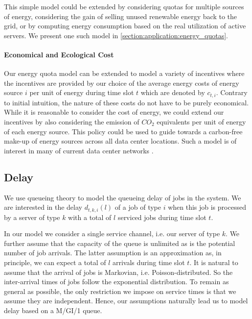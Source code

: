 This simple model could be extended by considering quotas for multiple sources of energy, considering the gain of selling unused renewable energy back to the grid, or by computing energy consumption based on the real utilization of active servers. We present one such model in \autoref{section:application:energy_quotas}.

\paragraph{Economical and Ecological Cost} Our energy quota model can be extended to model a variety of incentives where the incentives are provided by our choice of the average energy costs of energy source $i$ per unit of energy during time slot $t$ which are denoted by $c_{t,i}$. Contrary to initial intuition, the nature of these costs do not have to be purely economical. While it is reasonable to consider the cost of energy, we could extend our incentives by also considering the emission of $CO_2$ equivalents per unit of energy of each energy source. This policy could be used to guide towards a carbon-free make-up of energy sources across all data center locations. Such a model is of interest in many of current data center networks \cite{Hölzle2020, Miller2021}.

\subsection{Delay}

We use queueing theory to model the queueing delay of jobs in the system. We are interested in the delay $d_{t,k,i}(l)$ of a job of type $i$ when this job is processed by a server of type $k$ with a total of $l$ serviced jobs during time slot $t$.

In our model we consider a single service channel, i.e. our server of type $k$. We further assume that the capacity of the queue is unlimited as is the potential number of job arrivals. The latter assumption is an approximation as, in principle, we can expect a total of $l$ arrivals during time slot $t$. It is natural to assume that the arrival of jobs is Markovian, i.e. Poisson-distributed. So the inter-arrival times of jobs follow the exponential distribution. To remain as general as possible, the only restriction we impose on service times is that we assume they are independent. Hence, our assumptions naturally lead us to model delay based on a M/GI/1 queue.

